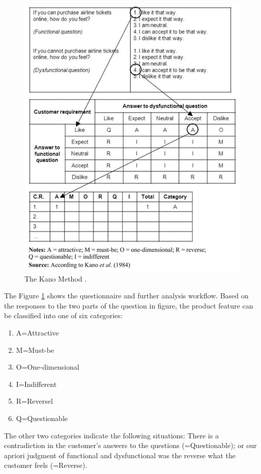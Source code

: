 \documentclass[../main.tex]{subfiles}
\begin{document}
\begin{figure}[H]
        \centering
        \includegraphics[scale=0.8]{img/3-background/kano/kanomodel.png}
        \caption{The Kano Method \cite{kanomodel1996}.}
        \label{fig:kanomodel}
\end{figure}

The Figure \ref{fig:kanomodel} shows the questionnaire and further analysis workflow. Based on the responses to the two parts of the question in figure, the product feature can be classified into one of six categories: 
\begin{enumerate}
    \item[] A=Attractive 
    \item[] M=Must-be 
    \item[] O=One-dimensional 
    \item[] I=Indifferent 
    \item[] R=Reversel 
    \item[] Q=Questionable 
\end{enumerate}

The other two categories indicate the following situations: There is a contradiction in the customer’s answers to the questions (=Questionable); or our apriori judgment of functional and dysfunctional was the reverse what the customer feels (=Reverse). \cite{berger1993kano}
\end{document}
